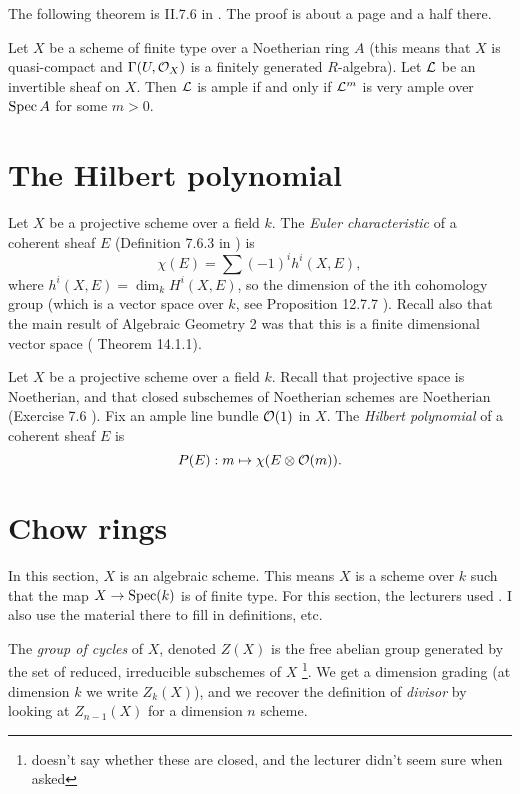 The following theorem is II.7.6 in \cite{hartshorne2013algebraic}. The proof is about a page and a half there. 
\begin{theorem}
	Let $X$ be a scheme of finite type over a Noetherian ring $A$ (this means that $X$ is quasi-compact and $\Gamma(U, \mathcal{O}_X)$ is a finitely generated $R$-algebra). Let $\mathcal{L}$ be an invertible sheaf on $X$. Then $\mathcal{L}$ is ample if and only if $\mathcal{L}^m$ is very ample over $\operatorname{Spec} A$ for some $m > 0$. 
\end{theorem}

\section{The Hilbert polynomial}

\begin{definition}
	Let $X$ be a projective scheme over a field $k$.  The \emph{Euler characteristic} of a coherent sheaf $E$ (Definition 7.6.3 in \cite{ag2}) is \[\chi(E) = \sum (-1)^i h^i(X, E),\] where $h^i(X, E) = \dim_k H^i(X, E)$, so the dimension of the ith cohomology group (which is a vector space over $k$, see Proposition 12.7.7 \cite{ag2}). Recall also that the main result of Algebraic Geometry 2 was that this is a finite dimensional vector space (\cite{ag2} Theorem 14.1.1).

\end{definition}

\begin{definition}
	Let $X$ be a projective scheme over a field $k$. Recall that projective space is Noetherian, and that closed subschemes of Noetherian schemes are Noetherian (Exercise 7.6 \cite{ag2}).
	Fix an ample line bundle $\mathcal{O}(1)$ in $X$. The \emph{Hilbert polynomial} of a coherent sheaf $E$ is \[
    	P(E): m \mapsto \chi(E \otimes \mathcal{O}(m)).
    \]
\end{definition}



\section{Chow rings}
In this section, $X$ is an algebraic scheme. This means $X$ is a scheme over $k$ such that the map $X \to \operatorname{Spec}(k)$ is of finite type.
For this section, the lecturers used \cite{eisenbud20163264}. I also use the material there to fill in definitions, etc.

\begin{definition}
	The \emph{group of cycles} of $X$, denoted $Z(X)$ is the free abelian group generated by the set of reduced, irreducible subschemes of $X$ \footnote{\cite{eisenbud20163264} doesn't say whether these are closed, and the lecturer didn't seem sure when asked}. We get a dimension grading (at dimension $k$ we write $Z_k(X)$), and we recover the definition of \emph{divisor} by looking at  $Z_{n-1}(X)$ for a dimension $n$ scheme.
\end{definition}

